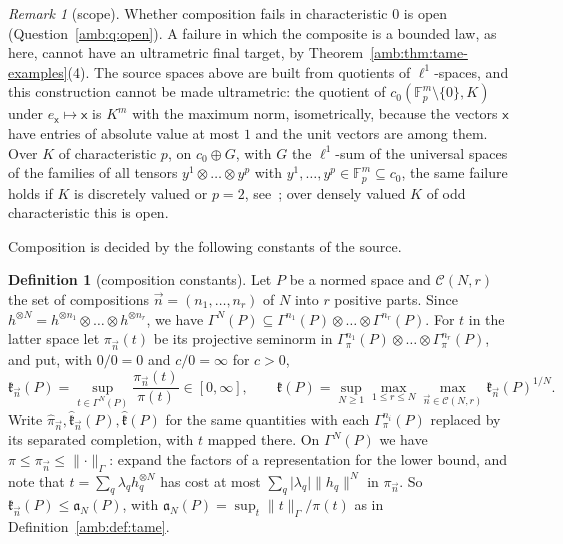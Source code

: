 \documentclass[11pt]{amsart}
\theoremstyle{definition}
\newtheorem{definition}[theorem]{Definition}
\theoremstyle{remark}
\newtheorem{remark}[theorem]{Remark}
\numberwithin{equation}{section}
\newcommand{\F}{\mathbb F}
\newcommand{\abs}[1]{\lvert #1\rvert}
\newcommand{\norm}[1]{\lVert #1\rVert}
\theoremstyle{plain}
\theoremstyle{definition}
\theoremstyle{plain}
\begin{document}
\begin{remark}[scope]\label{amb:rem:scope}
Whether composition fails in characteristic $0$ is open (Question~\ref{amb:q:open}). A failure in which the composite is a bounded law, as here, cannot have an ultrametric final target, by Theorem~\ref{amb:thm:tame-examples}(4). The source spaces above are built from quotients of $\ell^1$-spaces, and this construction cannot be made ultrametric: the quotient of $c_0(\F_p^m\setminus\{0\},K)$ under $e_{\mathsf x}\mapsto\mathsf x$ is $K^m$ with the maximum norm, isometrically, because the vectors $\mathsf x$ have entries of absolute value at most $1$ and the unit vectors are among them. Over $K$ of characteristic $p$, on $c_0\oplus G$, with $G$ the $\ell^1$-sum of the universal spaces of the families of all tensors $y^1\otimes\dots\otimes y^p$ with $y^1,\dots,y^p\in\F_p^m\subseteq c_0$, the same failure holds if $K$ is discretely valued or $p=2$, see~\cite{II}; over densely valued $K$ of odd characteristic this is open.
\end{remark}

Composition is decided by the following constants of the source.

\begin{definition}[composition constants]\label{amb:def:constants}
Let $P$ be a normed space and $\mathcal C(N,r)$ the set of compositions $\vec n=(n_1,\dots,n_r)$ of $N$ into $r$ positive parts. Since $h^{\otimes N}=h^{\otimes n_1}\otimes\dots\otimes h^{\otimes n_r}$, we have $\Gamma^N(P)\subseteq\Gamma^{n_1}(P)\otimes\dots\otimes\Gamma^{n_r}(P)$. For $t$ in the latter space let $\pi_{\vec n}(t)$ be its projective seminorm in $\Gamma^{n_1}_\pi(P)\otimes\dots\otimes\Gamma^{n_r}_\pi(P)$, and put, with $0/0=0$ and $c/0=\infty$ for $c>0$,
\[
 \mathfrak k_{\vec n}(P)=\sup_{t\in\Gamma^N(P)}\frac{\pi_{\vec n}(t)}{\pi(t)}\in[0,\infty],\qquad
 \mathfrak k(P)=\sup_{N\ge1}\max_{1\le r\le N}\max_{\vec n\in\mathcal C(N,r)}\mathfrak k_{\vec n}(P)^{1/N}.
\]
Write $\widehat\pi_{\vec n},\widehat{\mathfrak k}_{\vec n}(P),\widehat{\mathfrak k}(P)$ for the same quantities with each $\Gamma^{n_i}_\pi(P)$ replaced by its separated completion, with $t$ mapped there. On $\Gamma^N(P)$ we have $\pi\le\pi_{\vec n}\le\norm\cdot_\Gamma$: expand the factors of a representation for the lower bound, and note that $t=\sum_q\lambda_qh_q^{\otimes N}$ has cost at most $\sum_q\abs{\lambda_q}\norm{h_q}^N$ in $\pi_{\vec n}$. So $\mathfrak k_{\vec n}(P)\le\mathfrak a_N(P)$, with $\mathfrak a_N(P)=\sup_t\norm t_\Gamma/\pi(t)$ as in Definition~\ref{amb:def:tame}.
\end{definition}
\end{document}
